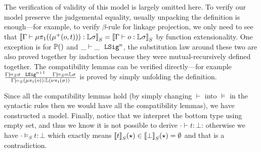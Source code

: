 The verification of validity of this model is largely omitted here. To verify our model preserve the judgemental equality, usually unpacking the definition is enough---for example, to verify $\beta$-rule for linkage projection, we only need to see that ${\llbracket {\ensuremath{ {\Gamma} \vdash {\ensuremath{\mu\pi_{\texttt{1}}({(\mu^+({o},{t}))})}} : {\mathbb{L}\sigma} }} \rrbracket}_S = {\llbracket {\ensuremath{ {\Gamma} \vdash {o} : {\mathbb{L}\sigma} }} \rrbracket}_S$ by function extensionality. One exception is for $\mathbb{P}({})$ and $ {\_} \vdash {\_} \ \ \texttt{LSig}^{n} $, the substitution law around these two are also proved together by induction because they were mutual-recursively defined together. The compatibility lemmas can be verified directly---for example $\frac{{ {\Gamma} \models_S {\sigma} \ \ \texttt{LSig}^{n+1} }\quad{ {\ensuremath{\Gamma}} \models_S {o} : {\ensuremath{\mathbb{L}}\sigma} }}{{ {\Gamma} \models_S {(\mu\pi_{\texttt{1}}({o}))} : {\mathbb{L}(\nu\pi_{\texttt{1}}({\sigma}))} }}$ is proved by simply unfolding the definition.


Since all the compatibility lemmas hold (by simply changing $\vdash$ into $\models$ in the syntactic rules then we would have all the compatibility lemmas), we have constructed a model.
Finally, notice that we interpret the bottom type using empty set, and thus we know it is not possible to derive $\cdot \vdash t : \bot$: otherwise we have $\cdot \models_S t : \bot$ which exactly means ${\llbracket {t} \rrbracket}_S(\star) \in {\llbracket {\bot} \rrbracket}_S(\star) = \emptyset$ 
and that is a contradiction.


